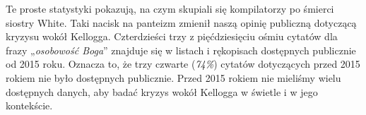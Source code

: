 Te proste statystyki pokazują, na czym skupiali się kompilatorzy po śmierci siostry White. Taki nacisk na panteizm zmienił naszą opinię publiczną dotyczącą kryzysu wokół Kellogga. Czterdzieści trzy z pięćdziesięciu ośmiu cytatów dla frazy „\textit{osobowość Boga}” znajduje się w listach i rękopisach dostępnych publicznie od 2015 roku. Oznacza to, że trzy czwarte (\textit{74\%}) cytatów dotyczących  przed 2015 rokiem nie było dostępnych publicznie. Przed 2015 rokiem nie mieliśmy wielu dostępnych danych, aby badać kryzys wokół Kellogga w świetle  i w jego kontekście.


